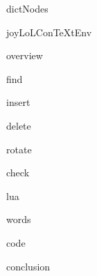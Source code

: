 
\usemodule[t-diSimp]

\startDiSimpComponent dictNodes

\diSimpEnvironment joyLoLConTeXtEnv

\startJoyLoLCoAlg[title=Dictionary Nodes][dictNodes]

\diSimpComponent overview

\diSimpComponent find

\diSimpComponent insert

\diSimpComponent delete

\diSimpComponent rotate

\diSimpComponent check

\diSimpComponent lua

\diSimpComponent words

\diSimpComponent code

\diSimpComponent conclusion

\stopJoyLoLCoAlg

\stopDiSimpComponent
